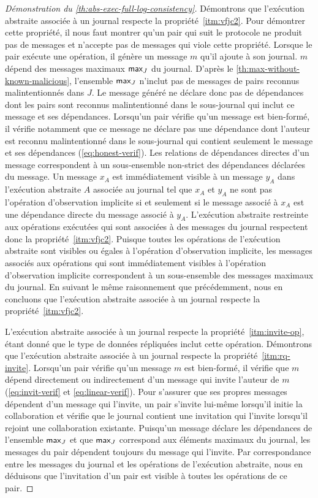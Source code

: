 \begin{proof}[Démonstration du \autoref{th:abs-exec-full-log-consistency}]
Démontrons que l'exécution abstraite associée à un journal respecte la propriété~\ref{itm:vfjc2}.
Pour démontrer cette propriété, il nous faut montrer qu'un pair qui suit le protocole ne produit pas de messages et n'accepte pas de messages qui viole cette propriété.
Lorsque le pair exécute une opération, il génère un message $m$ qu'il ajoute à son journal.
$m$ dépend des messages maximaux $\operatorname{\mathsf{max}}_J$ du journal.
D'après le \autoref{th:max-without-known-malicious}, l'ensemble $\operatorname{\mathsf{max}}_J$ n'inclut pas de messages de pairs reconnus malintentionnés dans $J$.
Le message généré ne déclare donc pas de dépendances dont les pairs sont reconnus malintentionné dans le sous-journal qui inclut ce message et ses dépendances.
Lorsqu'un pair vérifie qu'un message est bien-formé, il vérifie notamment que ce message ne déclare pas une dépendance dont l'auteur est reconnu malintentionné dans le sous-journal qui contient seulement le message et ses dépendances (\autoref{eq:honest-verif}).
Les relations de dépendances directes d'un message correspondent à un sous-ensemble non-strict des dépendances déclarées du message.
Un message $x_A$ est immédiatement visible à un message $y_A$ dans l'exécution abstraite $A$ associée au journal tel que $x_A$ et $y_A$ ne sont pas l'opération d'observation implicite si et seulement si le message associé à $x_A$ est une dépendance directe du message associé à $y_A$.
L'exécution abstraite restreinte aux opérations exécutées qui sont associées à des messages du journal respectent donc la propriété~\ref{itm:vfjc2}.
Puisque toutes les opérations de l'exécution abstraite sont visibles ou égales à l'opération d'observation implicite, les messages associés aux opérations qui sont immédiatement visibles à l'opération d'observation implicite correspondent à un sous-ensemble des messages maximaux du journal.
En suivant le même raisonnement que précédemment, nous en concluons que l'exécution abstraite associée à un journal respecte la propriété~\ref{itm:vfjc2}.

\medskip

L'exécution abstraite associée à un journal respecte la propriété~\ref{itm:invite-op}, étant donné que le type de données répliquées inclut cette opération.
Démontrons que l'exécution abstraite associée à un journal respecte la propriété~\ref{itm:rq-invite}.
Lorsqu'un pair vérifie qu'un message $m$ est bien-formé, il vérifie que $m$ dépend directement ou indirectement d'un message qui invite l'auteur de $m$ (\autoref{eq:invit-verif} et \autoref{eq:linear-verif}).
Pour s'assurer que ses propres messages dépendent d'un message qui l'invite, un pair s'invite lui-même lorsqu'il initie la collaboration et vérifie que le journal contient une invitation qui l'invite lorsqu'il rejoint une collaboration existante.
Puisqu'un message déclare les dépendances de l'ensemble $\operatorname{\mathsf{max}}_J$ et que $\operatorname{\mathsf{max}}_J$ correspond aux éléments maximaux du journal, les messages du pair dépendent toujours du message qui l'invite.
Par correspondance entre les messages du journal et les opérations de l'exécution abstraite, nous en déduisons que l'invitation d'un pair est visible à toutes les opérations de ce pair.


\end{proof}
